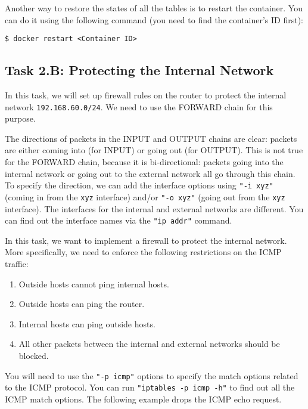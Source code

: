 Another way to restore the states of all the tables is to restart the 
container. You can do it using the following command (you need 
to find the container's ID first):

\begin{lstlisting}
$ docker restart <Container ID>
\end{lstlisting}
 


\subsection{Task 2.B: Protecting the Internal Network} 

In this task, we will set up firewall rules on the router to protect the 
internal network \texttt{192.168.60.0/24}. We need to use the 
FORWARD chain for this purpose. 

The directions of packets in the INPUT and OUTPUT chains are clear:
packets are either coming into (for INPUT) or going out (for OUTPUT). 
This is not true for the FORWARD chain, because it is 
bi-directional: packets going into
the internal network or going out to the external network
all go through this chain. To specify the direction,
we can add the interface options using \texttt{"-i xyz"} (coming in from 
the \texttt{xyz} interface) and/or \texttt{"-o xyz"} (going out 
from the \texttt{xyz} interface). The interfaces 
for the internal and external networks are different.
You can find out the interface names via the 
\texttt{"ip addr"} command.


In this task, we want to implement a firewall to protect the 
internal network. More specifically, we need to enforce the 
following restrictions on the ICMP traffic: 

\begin{enumerate}[noitemsep]
  \item Outside hosts cannot ping internal hosts. 
  \item Outside hosts can ping the router.
  \item Internal hosts can ping outside hosts. 
  \item All other packets between the internal and external networks should be blocked.
\end{enumerate}

You will need to use the \texttt{"-p icmp"} options to specify the match
options related to the ICMP protocol. You can run 
\texttt{"iptables -p icmp -h"} to find out all the ICMP match
options. The following example drops the ICMP echo request.


